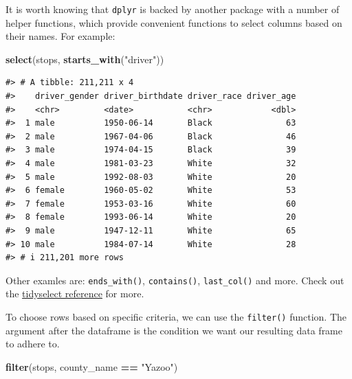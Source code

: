 \documentclass[
]{book}
\newenvironment{Shaded}{\begin{snugshade}}{\end{snugshade}}
\newcommand{\FunctionTok}[1]{\textcolor[rgb]{0.13,0.29,0.53}{\textbf{#1}}}
\newcommand{\NormalTok}[1]{#1}
\newcommand{\SpecialCharTok}[1]{\textcolor[rgb]{0.81,0.36,0.00}{\textbf{#1}}}
\newcommand{\StringTok}[1]{\textcolor[rgb]{0.31,0.60,0.02}{#1}}
\begin{document}
It is worth knowing that \texttt{dplyr} is backed by another package with a number of helper functions, which provide convenient functions to select columns based on their names. For example:

\begin{Shaded}
\begin{Highlighting}[]
\FunctionTok{select}\NormalTok{(stops, }\FunctionTok{starts\_with}\NormalTok{(}\StringTok{"driver"}\NormalTok{))}
\end{Highlighting}
\end{Shaded}

\begin{verbatim}
#> # A tibble: 211,211 x 4
#>    driver_gender driver_birthdate driver_race driver_age
#>    <chr>         <date>           <chr>            <dbl>
#>  1 male          1950-06-14       Black               63
#>  2 male          1967-04-06       Black               46
#>  3 male          1974-04-15       Black               39
#>  4 male          1981-03-23       White               32
#>  5 male          1992-08-03       White               20
#>  6 female        1960-05-02       White               53
#>  7 female        1953-03-16       White               60
#>  8 female        1993-06-14       White               20
#>  9 male          1947-12-11       White               65
#> 10 male          1984-07-14       White               28
#> # i 211,201 more rows
\end{verbatim}

Other examles are: \texttt{ends\_with()}, \texttt{contains()}, \texttt{last\_col()} and more. Check out the \href{https://tidyselect.r-lib.org/reference/language.html}{tidyselect reference} for more.

To choose rows based on specific criteria, we can use the \texttt{filter()} function. The argument after the dataframe is the condition we want our resulting data frame to adhere to.

\begin{Shaded}
\begin{Highlighting}[]
\FunctionTok{filter}\NormalTok{(stops, county\_name }\SpecialCharTok{==} \StringTok{"Yazoo"}\NormalTok{)}
\end{Highlighting}
\end{Shaded}
\end{document}
